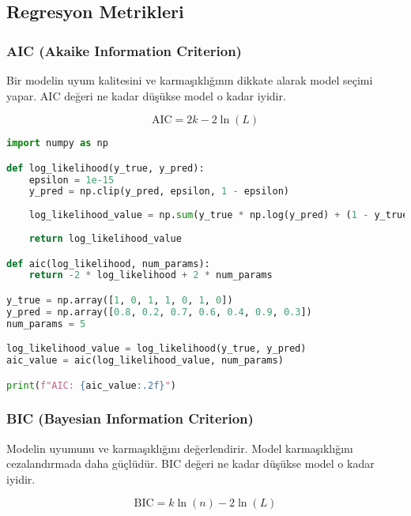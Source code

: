 \newpage

\subsection{Regresyon Metrikleri}

\subsubsection{AIC (Akaike Information Criterion)}

Bir modelin uyum kalitesini ve karmaşıklığının dikkate alarak model seçimi yapar. AIC değeri ne kadar düşükse model o kadar iyidir.

\[ \text{AIC} = 2k - 2\ln(L) \]

\begin{lstlisting}[language=Python]
import numpy as np

def log_likelihood(y_true, y_pred):
    epsilon = 1e-15
    y_pred = np.clip(y_pred, epsilon, 1 - epsilon)
    
    log_likelihood_value = np.sum(y_true * np.log(y_pred) + (1 - y_true) * np.log(1 - y_pred))
    
    return log_likelihood_value

def aic(log_likelihood, num_params):
    return -2 * log_likelihood + 2 * num_params

y_true = np.array([1, 0, 1, 1, 0, 1, 0])
y_pred = np.array([0.8, 0.2, 0.7, 0.6, 0.4, 0.9, 0.3])
num_params = 5

log_likelihood_value = log_likelihood(y_true, y_pred)
aic_value = aic(log_likelihood_value, num_params)

print(f"AIC: {aic_value:.2f}")
\end{lstlisting}

\newpage

\subsubsection{BIC (Bayesian Information Criterion)}

Modelin uyumunu ve karmaşıklığını değerlendirir. Model karmaşıklığını cezalandırmada daha güçlüdür. BIC değeri ne kadar düşükse model o kadar iyidir.

\[ \text{BIC} = k \ln(n) - 2\ln(L) \]

